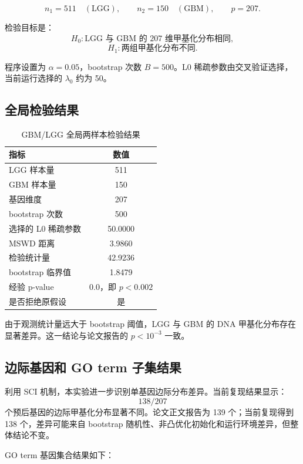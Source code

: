 \documentclass[UTF8,a4paper,11pt]{ctexart}
\begin{document}
\[
n_1=511\quad(\mathrm{LGG}),\qquad n_2=150\quad(\mathrm{GBM}),\qquad p=207.
\]

检验目标是：
\[
H_0:\text{LGG 与 GBM 的 207 维甲基化分布相同},
\]
\[
H_1:\text{两组甲基化分布不同}.
\]

程序设置为 \(\alpha=0.05\)，bootstrap 次数 \(B=500\)。L0 稀疏参数由交叉验证选择，当前运行选择的 \(\lambda_{0}\) 约为 50。

\subsection{全局检验结果}

\begin{table}[H]
\centering
\caption{GBM/LGG 全局两样本检验结果}
\begin{tabular}{lc}
\toprule
指标 & 数值 \\
\midrule
LGG 样本量 & 511 \\
GBM 样本量 & 150 \\
基因维度 & 207 \\
bootstrap 次数 & 500 \\
选择的 L0 稀疏参数 & 50.0000 \\
MSWD 距离 & 3.9860 \\
检验统计量 & 42.9236 \\
bootstrap 临界值 & 1.8479 \\
经验 p-value & 0.0，即 \(p<0.002\) \\
是否拒绝原假设 & 是 \\
\bottomrule
\end{tabular}
\end{table}

由于观测统计量远大于 bootstrap 阈值，LGG 与 GBM 的 DNA 甲基化分布存在显著差异。这一结论与论文报告的 \(p<10^{-3}\) 一致。

\subsection{边际基因和 GO term 子集结果}

利用 SCI 机制，本实验进一步识别单基因边际分布差异。当前复现结果显示：
\[
138/207
\]
个预后基因的边际甲基化分布显著不同。论文正文报告为 139 个；当前复现得到 138 个，差异可能来自 bootstrap 随机性、非凸优化初始化和运行环境差异，但整体结论不变。

GO term 基因集合结果如下：
\end{document}

